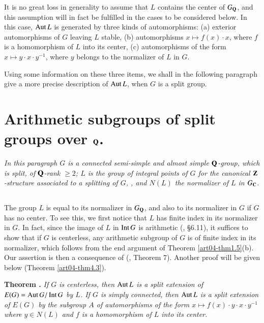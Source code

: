\begin{remark*}
It is no great loss in generality to assume that $L$ contains the center of $G_{\mathbf{Q}}$, and this assumption will in fact be fulfilled in the cases to be considered below. In this case, $\operatorname{\mathrm{Aut}} L$ is generated by three kinds of automorphisms: (a) exterior automorphisms of $G$ leaving $L$ stable, (b) automorphisms $x\mapsto f(x)\cdot x$, where $f$ is a homomorphism of $L$ into its center, (c) automorphisms of the form $x\mapsto y\cdot x\cdot y^{-1}$, where $y$ belongs to the normalizer of $L$ in $G$.
\end{remark*}

Using some information on these three items, we shall in the following paragraph give a more precise description of $\operatorname{\mathrm{Aut}} L$, when $G$ is a split group.

\section{Arithmetic subgroups of split groups over \texorpdfstring{$\mathbf{Q}$}{Q}.}\label{art04-sec2}

{\em In this paragraph $G$ is a connected semi-simple and almost simple $\mathbf{Q}$-group, which is split, of $\mathbf{Q}$-rank $\geq 2$; $L$ is the group of integral points of $G$ for the canonical $\mathbf{Z}$-structure associated to a splitting of $G$\cite{art04-key10}, \cite{art04-key18}, and $N(L)$ the normalizer of $L$ in $G_{\mathbf{C}}$.}

\subsection{}\label{art04-sec2.1}
The group $L$ is equal to its normalizer in $G_{\mathbf{Q}}$, and also to its normalizer in $G$ if $G$ has no center. To see this, we first notice that $L$ has finite index in its normalizer in $G$. In fact, since the image of $L$ in $\operatorname{\mathrm{Int}} G$ is arithmetic (\cite{art04-key7}, \S6.11), it suffices to show that if $G$ is centerless, any arithmetic subgroup of $G$ is of finite index in its normalizer, which follows from the end argument of Theorem \ref{art04-thm1.5}(b). Our assertion is then a consequence of (\cite{art04-key6}, Theorem 7). Another proof will be given below (Theorem \ref{art04-thm4.3}).

\medskip
\noindent
{\bf Theorem .\label{art04-thm2.2}}
{\em If $G$ is centerless, then $\operatorname{\mathrm{Aut}} L$ is a split extension of $E(G)=\operatorname{\mathrm{Aut}} G/\operatorname{\mathrm{Int}} G$ by $L$. If $G$ is simply connected, then $\operatorname{\mathrm{Aut}} L$ is a split extension of $E(G)$ by the subgroup $A$ of automorphisms of the form $x\mapsto f(x)\cdot y\cdot x\cdot y^{-1}$ where $y\in N(L)$ and $f$ is a homomorphism of $L$ into its center.}
\smallskip

